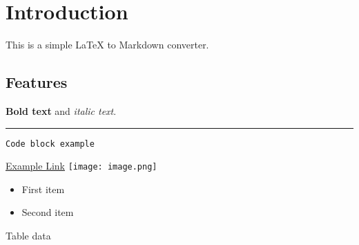 \section{Introduction}
This is a simple LaTeX to Markdown converter.

\subsection{Features}
\textbf{Bold text} and \textit{italic text}.
\hrule
\par
\begin{verbatim}
Code block example
\end{verbatim}

\href{https://example.com}{Example Link}
\texttt{[image: image.png]}

\begin{itemize}
\item First item
\item Second item
\end{itemize}

\begin{tabular}
Table data
\end{tabular}
